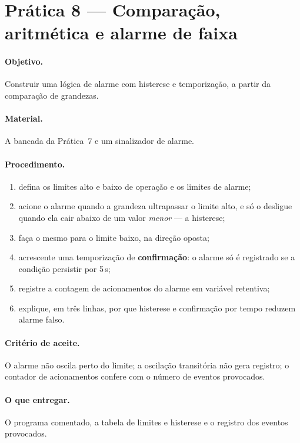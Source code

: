 \section{Prática 8 --- Comparação, aritmética e alarme de faixa}

\paragraph{Objetivo.} Construir uma lógica de alarme com histerese e temporização, a partir da
comparação de grandezas.

\paragraph{Material.} A bancada da Prática~7 e um sinalizador de alarme.

\paragraph{Procedimento.}
\begin{enumerate}
  \item defina os limites alto e baixo de operação e os limites de alarme;
  \item acione o alarme quando a grandeza ultrapassar o limite alto, e só o desligue quando ela cair
        abaixo de um valor \emph{menor} --- a histerese;
  \item faça o mesmo para o limite baixo, na direção oposta;
  \item acrescente uma temporização de \textbf{confirmação}: o alarme só é registrado se a condição
        persistir por 5\,s;
  \item registre a contagem de acionamentos do alarme em variável retentiva;
  \item explique, em três linhas, por que histerese e confirmação por tempo reduzem alarme falso.
\end{enumerate}

\paragraph{Critério de aceite.} O alarme não oscila perto do limite; a oscilação transitória não gera
registro; o contador de acionamentos confere com o número de eventos provocados.

\paragraph{O que entregar.} O programa comentado, a tabela de limites e histerese e o registro dos
eventos provocados.

